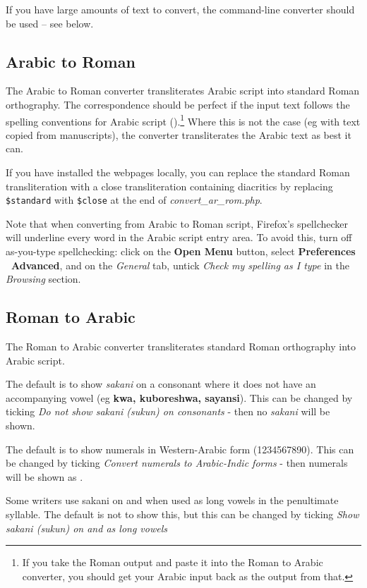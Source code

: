 \documentclass[a4paper,10pt, oneside]{book}
\newcommand\AS[1]{{\citationfont\RLE{#1}}}
\begin{document}
If you have large amounts of text to convert, the command-line converter should be used -- see  below.

\subsection{Arabic to Roman}

The Arabic to Roman converter transliterates Arabic script into standard Roman orthography.  The correspondence should be perfect if the input text follows the spelling conventions for Arabic script ().\footnote{If you take the Roman output and paste it into the Roman to Arabic converter, you should get your Arabic input back as the output from that.}  Where this is not the case (eg with text copied from manuscripts), the converter transliterates the Arabic text as best it can.

If you have installed the webpages locally, you can replace the standard Roman transliteration with a close transliteration containing diacritics by replacing \verb|$standard| with \verb|$close| at the end of \textit{convert\_ar\_rom.php}.

Note that when converting from Arabic to Roman script, Firefox's spellchecker will underline every word in the Arabic script entry area. To avoid this, turn off as-you-type spellchecking: click on the \textbf{Open Menu} button, select \textbf{Preferences \textrightarrow\ Advanced}, and on the \textit{General} tab, untick \textit{Check my spelling as I type} in the \textit{Browsing} section.

\subsection{Roman to Arabic}

The Roman to Arabic converter transliterates standard Roman orthography into Arabic script. 

The default is to show \textit{sakani} on a consonant where it does not have an accompanying vowel (eg \textbf{kwa, kuboreshwa, sayansi}). This can be changed by ticking \textit{Do not show sakani (sukun) on consonants} - then no \textit{sakani} will be shown.

The default is to show numerals in Western-Arabic form (1234567890). This can be changed by ticking \textit{Convert numerals to Arabic-Indic forms} - then numerals will be shown as \AS{١٢٣٤٥٦٧٨٩٠}.

Some writers use sakani on \AS{و} and \AS{ي} when used as long vowels in the penultimate syllable. The default is not to show this, but this can be changed by ticking \textit{Show sakani (sukun) on \AS{و} and \AS{ي} as long vowels}
\end{document}
